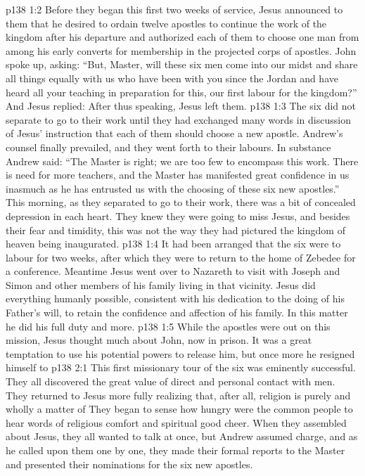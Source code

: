 \vs p138 1:2 Before they began this first two weeks of service, Jesus announced to them that he desired to ordain twelve apostles to continue the work of the kingdom after his departure and authorized each of them to choose one man from among his early converts for membership in the projected corps of apostles. John spoke up, asking: “But, Master, will these six men come into our midst and share all things equally with us who have been with you since the Jordan and have heard all your teaching in preparation for this, our first labour for the kingdom?” And Jesus replied:  After thus speaking, Jesus left them.
\vs p138 1:3 The six did not separate to go to their work until they had exchanged many words in discussion of Jesus’ instruction that each of them should choose a new apostle. Andrew’s counsel finally prevailed, and they went forth to their labours. In substance Andrew said: “The Master is right; we are too few to encompass this work. There is need for more teachers, and the Master has manifested great confidence in us inasmuch as he has entrusted us with the choosing of these six new apostles.” This morning, as they separated to go to their work, there was a bit of concealed depression in each heart. They knew they were going to miss Jesus, and besides their fear and timidity, this was not the way they had pictured the kingdom of heaven being inaugurated.
\vs p138 1:4 It had been arranged that the six were to labour for two weeks, after which they were to return to the home of Zebedee for a conference. Meantime Jesus went over to Nazareth to visit with Joseph and Simon and other members of his family living in that vicinity. Jesus did everything humanly possible, consistent with his dedication to the doing of his Father’s will, to retain the confidence and affection of his family. In this matter he did his full duty and more.
\vs p138 1:5 While the apostles were out on this mission, Jesus thought much about John, now in prison. It was a great temptation to use his potential powers to release him, but once more he resigned himself to 
\vs p138 2:1 This first missionary tour of the six was eminently successful. They all discovered the great value of direct and personal contact with men. They returned to Jesus more fully realizing that, after all, religion is purely and wholly a matter of  They began to sense how hungry were the common people to hear words of religious comfort and spiritual good cheer. When they assembled about Jesus, they all wanted to talk at once, but Andrew assumed charge, and as he called upon them one by one, they made their formal reports to the Master and presented their nominations for the six new apostles.
